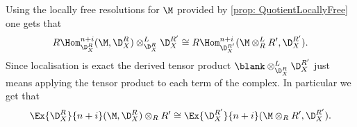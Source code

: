Using the locally free resolutions for $\M$ provided by \cref{prop: QuotientLocallyFree} one gets that
$$R\Hom_{\D_X^R}^{n+i}(\M,\D_X^R)\otimes_{\D_X^R}^L \D_X^{R'} \cong R\Hom_{\D_X^{R'}}^{n+i}(\M\otimes_R^L R',\D_X^{R'}).$$
Since localisation is exact the derived tensor product $\blank\otimes_{\D_X^R}^L \D_X^{R'}$ just means applying the tensor product to each term of the complex.
In particular we get that
$$\Ex{\D_X^R}{n+i}(\M,\D_X^R)\otimes_{R} R' \cong \Ex{\D_X^{R'}}{n+i}(\M\otimes_R R',\D_X^{R'}).$$
